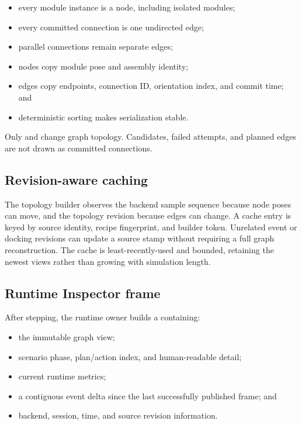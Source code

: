 \begin{itemize}
  \item every module instance is a node, including isolated modules;
  \item every committed connection is one undirected edge;
  \item parallel connections remain separate edges;
  \item nodes copy module pose and assembly identity;
  \item edges copy endpoints, connection ID, orientation index, and commit time; and
  \item deterministic sorting makes serialization stable.
\end{itemize}

Only  and  change graph topology. Candidates,
failed attempts, and planned edges are not drawn as committed connections.

\subsection{Revision-aware caching}

The topology builder observes the backend sample sequence because node poses can move,
and the topology revision because edges can change. A cache entry is keyed by source
identity, recipe fingerprint, and builder token. Unrelated event or docking revisions
can update a source stamp without requiring a full graph reconstruction. The cache is
least-recently-used and bounded, retaining the newest views rather than growing with
simulation length.

\subsection{Runtime Inspector frame}

After stepping, the runtime owner builds a  containing:

\begin{itemize}
  \item the immutable graph view;
  \item scenario phase, plan/action index, and human-readable detail;
  \item current runtime metrics;
  \item a contiguous event delta since the last successfully published frame; and
  \item backend, session, time, and source revision information.
\end{itemize}

